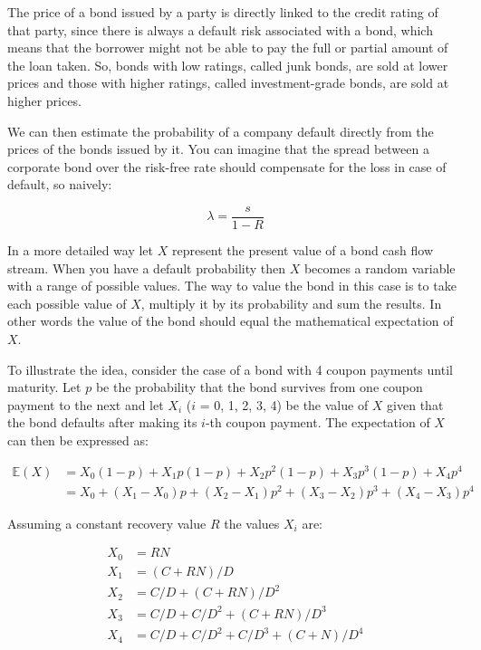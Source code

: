 The price of a bond issued by a party is directly linked to the credit
rating of that party, since there is always a default risk associated
with a bond, which means that the borrower might not be able to pay the
full or partial amount of the loan taken. So, bonds with low ratings,
called junk bonds, are sold at lower prices and those with higher
ratings, called investment-grade bonds, are sold at higher prices.

We can then estimate the probability of a company default directly from
the prices of the bonds issued by it. You can imagine that the spread
between a corporate bond over the risk-free rate should compensate for
the loss in case of default, so naively:

\[\lambda = \frac{s}{1-R}\]

In a more detailed way let $X$ represent the present value of a bond cash flow stream. When you
have a default probability then $X$ becomes a random variable with a range
of possible values. The way
to value the bond in this case is to take each possible value of $X$, multiply it
by its probability and sum the results. In other words the value of the bond
should equal the mathematical expectation of $X$.

To illustrate the idea, consider the case of a bond with 4 coupon payments
until maturity. Let $p$ be the probability that the bond survives from one
coupon payment to the next and let $X_i$ ($i$ = 0, 1, 2, 3, 4) be the value of
$X$ given that the bond defaults after making its $i$-th coupon payment. 
The expectation of $X$ can then be expressed as:

\begin{align*}
\mathbb{E}(X) &= X_0(1-p) + X_1 p(1-p) + X_2 p^2 (1-p) + X_3 p^3 (1-p) + X_4 p^4 \\
&= X_0 + (X_1 - X_0)p + (X_2 - X_1)p^2 + (X_3 - X_2)p^3 + (X_4 - X_3)p^4
\end{align*}

Assuming a constant recovery value $R$ the values $X_i$ are:

\begin{align*}
X_0 &= RN \\
X_1 &= (C + RN)/D \\
X_2 &= C/D + (C + RN)/D^2 \\
X_3 &= C/D + C/D^2 + (C + RN)/D^3 \\
X_4 &= C/D + C/D^2 + C/D^3 + (C + N)/D^4 \\
\end{align*}

